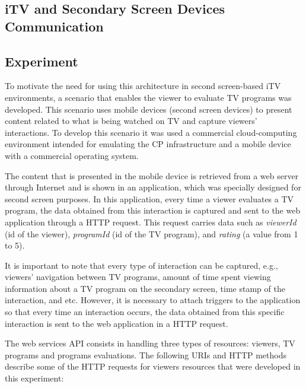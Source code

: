\documentclass[journal]{IEEEtran}
\begin{document}
\subsection{iTV and Secondary Screen Devices Communication}



\subsection{Experiment}

To motivate the need for using this architecture in second screen-based iTV environments, a scenario that enables the viewer to evaluate TV programs was developed. This scenario uses mobile devices (second screen devices) to present content related to what is being watched on TV and capture viewers' interactions. To develop this scenario it was used a commercial cloud-computing environment intended for emulating the CP infrastructure and a mobile device with a commercial operating system.

The content that is presented in the mobile device is retrieved from a web server through Internet and is shown in an application, which was specially designed for second screen purposes. In this application, every time a viewer evaluates a TV program, the data obtained from this interaction is captured and sent to the web application through a HTTP request. This request carries data such as \emph{viewerId} (id of the viewer), \emph{programId} (id of the TV program), and \emph{rating} (a value from 1 to 5).

It is important to note that every type of interaction can be captured, e.g., viewers' navigation between TV programs, amount of time spent viewing information about a TV program on the secondary screen, time stamp of the interaction, and etc. However, it is necessary to attach triggers to the application so that every time an interaction occurs, the data obtained from this specific interaction is sent to the web application in a HTTP request.

The web services API consists in handling three types of resources: viewers, TV programs and programs evaluations. The following URIs and HTTP methods describe some of the HTTP requests for viewers resources that were developed in this experiment:
\end{document}

